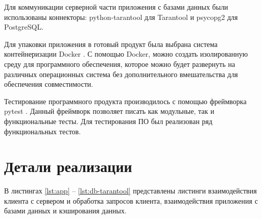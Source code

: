 Для коммуникации серверной части приложения с базами данных были использованы коннекторы: python-tarantool \cite{python-tarantool} для Tarantool и psycopg2 \cite{psycopg2} для PostgreSQL.

Для упаковки приложения в готовый продукт была выбрана система контейнеризации Docker \cite{docker}. С помощью Docker, можно создать изолированную среду для программного обеспечения, которое можно будет развернуть на различных операционных система без дополнительного вмешательства для обеспечения совместимости.

Тестирование программного продукта производилось с помощью фреймворка pytest \cite{pytest}. Данный фреймворк позволяет писать как модульные, так и функциональные тесты. Для тестирования ПО был реализован ряд функциональных тестов.

\section{Детали реализации}

В листингах \ref{lst:app} -- \ref{lst:db-tarantool} представлены листинги взаимодействия клиента с сервером и обработка запросов клиента, взаимодействия приложения с базами данных и кэширования данных.

